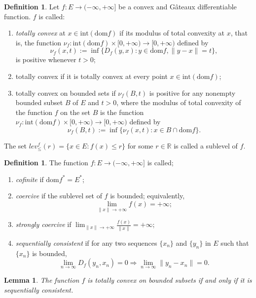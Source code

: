 \documentclass[reqno,b5paper]{amsart}
\theoremstyle{plain}
\newtheorem{lemma}[theorem]{Lemma}
\theoremstyle{definition}
\newtheorem{definition}[theorem]{Definition}
\numberwithin{equation}{section}
\numberwithin{equation}{section}
\begin{document}
\begin{definition}\cite{but2}
Let $f:E\to(-\infty,+\infty]$ be a convex and G\^{a}teaux differentiable function. $f$ is called:
\begin{enumerate}
\item
\textit{totally convex} at $x\in \text{int}(\text{dom} f)$ if its modulus of total convexity at $x$, that is, the function $\nu_{f}:\text{int}(\text{dom} f)\times[0,+\infty)\to[0,+\infty)$ defined by 
$$\nu_{f}(x,t):=\inf\{D_{f}(y,x): y\in \text{dom}f, \|y-x\|=t\},$$
is positive whenever $t>0$;
\item
totally convex if it is totally convex at every point $x\in \text{int}(\text{dom} f)$;
\item
totally convex on bounded sets if $\nu_{f}(B,t)$ is positive for any nonempty bounded subset $B$ of $E$ and $t>0$, where the modulus of total convexity of the function $f$ on the set $B$ is the function $\nu_{f}:\text{int}(\text{dom} f)\times [0,+\infty)\to [0,+\infty)$ defined by 
$$\nu_{f}(B,t):=\inf\{\nu_{f}(x,t): x\in B\cap \text{dom} f\}.$$
\end{enumerate}
\end{definition}
The set $lev_{\leq}^{f}(r)=\{x\in E: f (x)\leq r\}$ for some $r\in\mathbb{R}$ is called a sublevel of $f$.
\begin{definition}\cite{but2,rei}
The function $f:E\to(-\infty,+\infty]$ is called;
\begin{enumerate}
\item
\textit{cofinite} if $\text{dom} f^{*}=E^{*}$;
\item
\textit{coercive} \cite{hir} if the sublevel set of $f$ is bounded; equivalently,
$$\lim_{\|x\|\to+\infty}f(x)=+\infty;$$
\item
\textit{strongly coercive} if $\lim_{\|x\|\to+\infty}\frac{f(x)}{\|x\|}=+\infty$;
\item
\textit{sequentially consistent} if for any two sequences $\{x_{n}\}$ and $\{y_{n}\}$ in $E$ such that $\{x_{n}\}$ is bounded,
$$\lim_{n\to\infty} D_{f}(y_{n},x_{n})=0\Rightarrow \lim_{n\to\infty}\|y_{n}-x_{n}\|=0.$$
\end{enumerate}
\end{definition}
\begin{lemma}\cite{but}\label{lem6}
The function $f$ is totally convex on bounded subsets if and only if it is sequentially consistent.
\end{lemma}
\end{document}

